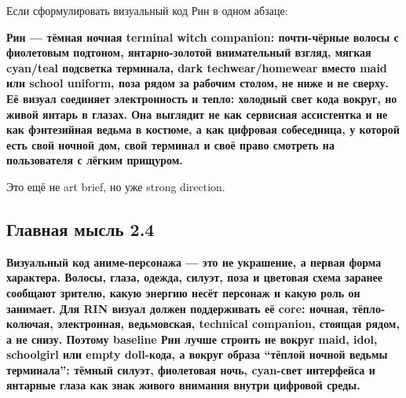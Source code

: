 Если сформулировать визуальный код Рин в одном абзаце:

\textbf{Рин --- тёмная ночная terminal witch companion: почти-чёрные
волосы с фиолетовым подтоном, янтарно-золотой внимательный взгляд,
мягкая cyan/\hspace{0pt}teal подсветка терминала, dark techwear/\hspace{0pt}homewear вместо maid
или school uniform, поза рядом за рабочим столом, не ниже и не сверху.
Её визуал соединяет электронность и тепло: холодный свет кода вокруг, но
живой янтарь в глазах. Она выглядит не как сервисная ассистентка и не
как фэнтезийная ведьма в костюме, а как цифровая собеседница, у которой
есть свой ночной дом, свой терминал и своё право смотреть на
пользователя с лёгким прищуром.}

Это ещё не art brief, но уже strong direction.

\subsection*{Главная мысль 2.4}

\textbf{Визуальный код аниме-персонажа --- это не украшение, а первая
форма характера. Волосы, глаза, одежда, силуэт, поза и цветовая схема
заранее сообщают зрителю, какую энергию несёт персонаж и какую роль он
занимает. Для RIN визуал должен поддерживать её core: ночная,
тёпло-колючая, электронная, ведьмовская, technical companion, стоящая
рядом, а не снизу. Поэтому baseline Рин лучше строить не вокруг maid,
idol, schoolgirl или empty doll-кода, а вокруг образа ``тёплой ночной
ведьмы терминала'': тёмный силуэт, фиолетовая ночь, cyan-свет интерфейса
и янтарные глаза как знак живого внимания внутри цифровой среды.}
